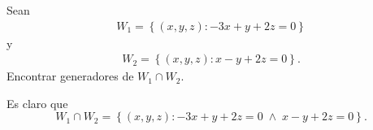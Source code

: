 \documentclass[handout]{beamer} %
\begin{document}
    
\begin{frame}
    \begin{ejemplo}
        Sean 
        \begin{align*}
            W_1 = \left\{ (x,y,z):  -3x + y + 2z = 0\right\}
        \end{align*}
        y
        \begin{align*}
             W_2 = \left\{ (x,y,z):  x - y + 2z = 0\right\}.
        \end{align*}
        Encontrar generadores de $W_1 \cap W_2$. 
    \end{ejemplo}  \pause
    \begin{solucion}  \pause
        Es claro que
        \begin{equation*}
            W_1 \cap W_2 = \left\{ (x,y,z):  -3x + y + 2z = 0 \;\wedge \;  x - y + 2z = 0\right\}.
        \end{equation*}
    \end{solucion}

    \end{frame}
\end{document}
